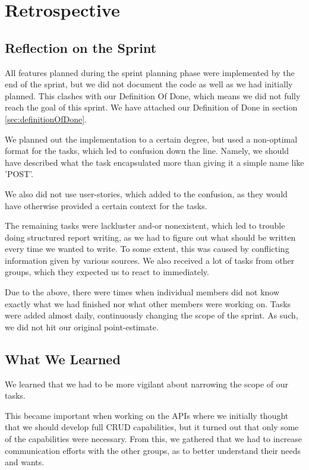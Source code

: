 \section{Retrospective}

\subsection{Reflection on the Sprint}
All features planned during the sprint planning phase were implemented by the end of the sprint, but we did not document the code as well as we had initially planned. 
This clashes with our Definition Of Done, which means we did not fully reach the goal of this sprint. We have attached our Definition of Done in section \ref{sec:definitionOfDone}.

We planned out the implementation to a certain degree, but used a non-optimal format for the tasks, which led to confusion down the line. Namely, we should have described what the task encapsulated more than giving it a simple name like 'POST'. 

We also did not use user-stories, which added to the confusion, as they would have otherwise provided a certain context for the tasks.

The remaining tasks were lackluster and-or nonexistent, which led to trouble doing structured report writing, as we had to figure out what should be written every time we wanted to write. To some extent, this was caused by conflicting information given by various sources. We also received a lot of tasks from other groups, which they expected us to react to immediately.
    
Due to the above, there were times when individual members did not know exactly what we had finished nor what other members were working on. Tasks were added almost daily, continuously changing the scope of the sprint.
As such, we did not hit our original point-estimate.

\subsection{What We Learned}\label{Whatwelearnedsprint3}
We learned that we had to be more vigilant about narrowing the scope of our tasks. 

This became important when working on the APIs where we initially thought that we should develop full CRUD capabilities, but it turned out that only some of the capabilities were necessary. 
From this, we gathered that we had to increase communication efforts with the other groups, as to better understand their needs and wants. 


